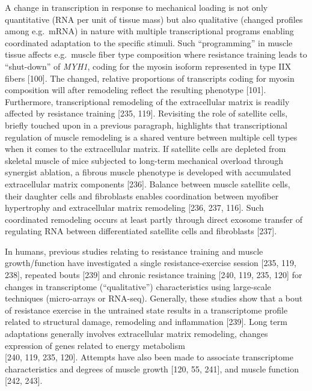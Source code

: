\documentclass[twoside,10pt]{gihclass} %
\begin{document}
A change in transcription in response to mechanical loading is not only quantitative (RNA per unit of tissue mass) but also qualitative (changed profiles among e.g.~mRNA) in nature with multiple transcriptional programs enabling coordinated adaptation to the specific stimuli.
Such ``programming'' in muscle tissue affects e.g.~muscle fiber type composition where resistance training leads to ``shut-down'' of \emph{MYH1}, coding for the myosin isoform represented in type IIX fibers
{[}100{]}.
The changed, relative proportions of transcripts coding for myosin composition will after remodeling reflect the resulting phenotype
{[}101{]}.
Furthermore, transcriptional remodeling of the extracellular matrix is readily affected by resistance training
{[}235, 119{]}.
Revisiting the role of satellite cells, briefly touched upon in a previous paragraph, highlights that transcriptional regulation of muscle remodeling is a shared venture between multiple cell types when it comes to the extracellular matrix.
If satellite cells are depleted from skeletal muscle of mice subjected to long-term mechanical overload through synergist ablation, a fibrous muscle phenotype is developed with accumulated extracellular matrix components
{[}236{]}.
Balance between muscle satellite cells, their daughter cells and fibroblasts enables coordination between myofiber hypertrophy and extracellular matrix remodeling
{[}236, 237, 116{]}.
Such coordinated remodeling occurs at least partly through direct exosome transfer of regulating RNA between differentiated satellite cells and fibroblasts
{[}237{]}.

In humans, previous studies relating to resistance training and muscle growth/function have investigated a single resistance-exercise session {[}235, 119, 238{]},
repeated bouts
{[}239{]}
and chronic resistance training {[}240, 119, 235, 120{]}
for changes in transcriptome (``qualitative'') characteristics using large-scale techniques (micro-arrays or RNA-seq).
Generally, these studies show that a bout of resistance exercise in the untrained state results in a transcriptome profile related to structural damage, remodeling and inflammation
{[}239{]}.
Long term adaptations generally involves extracellular matrix remodeling, changes expression of genes related to energy metabolism\\
{[}240, 119, 235, 120{]}.
Attempts have also been made to associate transcriptome characteristics and degrees of muscle growth
{[}120, 55, 241{]},
and muscle function
{[}242, 243{]}.
\end{document}
